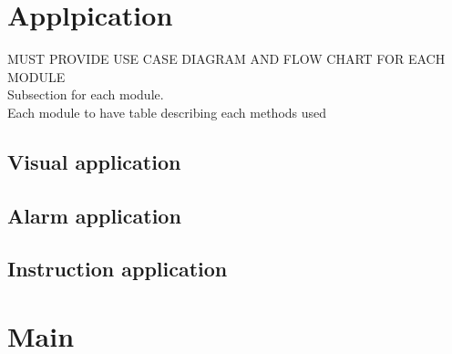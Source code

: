 \section{Applpication}
MUST PROVIDE USE CASE DIAGRAM AND FLOW CHART FOR EACH MODULE\\
Subsection for each module.\\
Each module to have table describing each methods used\\

\subsection{Visual application}

\subsection{Alarm application}

\subsection{Instruction application}
\section{Main}